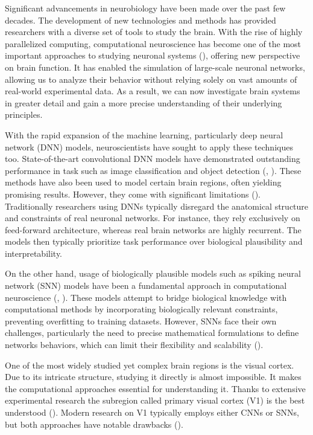 

Significant advancements in neurobiology have been made over 
the past few decades. The development of new technologies and 
methods has provided researchers with a diverse set of tools to
study the brain. With the rise of highly parallelized computing, 
computational neuroscience has become one of the most important 
approaches to studying neuronal systems (\citet{trappenberg2009fundamentals}), 
offering new perspective on
brain function. It has enabled the simulation of large-scale neuronal 
networks, allowing us to analyze their behavior without relying solely
on vast amounts of real-world experimental data. As a result, we can 
now investigate brain systems in greater detail and gain a more precise 
understanding of their underlying principles.

With the rapid expansion of the machine learning, particularly deep neural 
network (DNN) models, neuroscientists have sought to apply these techniques
too. State-of-the-art convolutional DNN models have demonstrated outstanding
performance in task such as image classification and object detection 
(\citet{krizhevsky2012imagenet}, \citet{li2014medical}). 
These methods have also been used to model certain brain regions, often
yielding promising results. However, they come
with significant limitations (\citet{celeghin2023convolutional}).
Traditionally researchers using DNNs typically disregard the anatomical structure
and constraints of real neuronal networks. For instance, they rely exclusively on 
feed-forward architecture, whereas real brain networks are highly recurrent.
The models then typically prioritize task performance over biological plausibility
and interpretability.

On the other hand, usage of biologically plausible models such as 
spiking neural network (SNN) models have been a fundamental approach in computational
neuroscience (\citet{ghosh2009spiking}, \citet{yamazaki2022spiking}). 
These models attempt to bridge biological knowledge with computational
methods by incorporating biologically relevant constraints, preventing overfitting to
training datasets. However, SNNs face their own challenges, particularly the need 
to precise mathematical formulations to define networks behaviors, which can
limit their flexibility and scalability (\citet{izhikevich2004model}).

One of the most widely studied yet complex brain regions is the visual cortex.
Due to its intricate structure, studying it directly is almost impossible.
It makes the computational approaches essential for understanding it. 
Thanks to extensive experimental research the subregion called primary visual 
cortex (V1) is the best understood (\citet{miikkulainen2006computational}). 
Modern research on V1 typically employs 
either CNNs or SNNs, but both approaches have notable 
drawbacks (\citet{niell2021cortical}).

